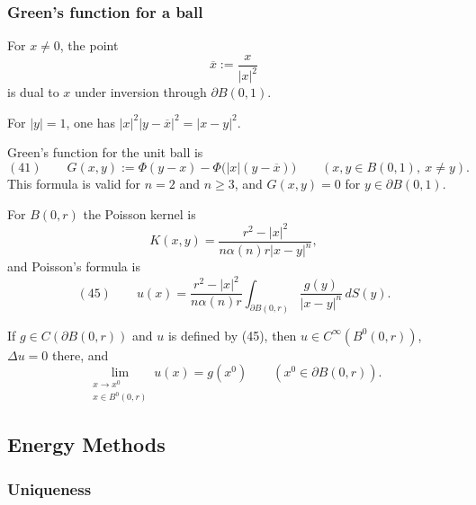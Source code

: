 \subsubsection{Green's function for a ball}
\label{sec:laplace-greens-function-ball}

\begin{definition}
\label{def:dual-point-unit-sphere}
\leanok
For $x\ne0$, the point
$$\overline x:=\frac{x}{|x|^2}$$
is dual to $x$ under inversion through $\partial B(0,1)$.
\end{definition}

For $|y|=1$, one has $|x|^2|y-\overline x|^2=|x-y|^2$.

\begin{definition}
\label{def:greens-function-ball}
\leanok
Green's function for the unit ball is
$$(41)\qquad
G(x,y):=\Phi(y-x)-\Phi\bigl(|x|(y-\overline x)\bigr)
\qquad(x,y\in B(0,1),\ x\ne y).$$
This formula is valid for $n=2$ and $n\ge3$, and $G(x,y)=0$ for
$y\in\partial B(0,1)$.
\end{definition}

For $B(0,r)$ the Poisson kernel is
$$K(x,y)=\frac{r^2-|x|^2}{n\alpha(n)r|x-y|^n},$$
and Poisson's formula is
$$(45)\qquad
u(x)=\frac{r^2-|x|^2}{n\alpha(n)r}
\int_{\partial B(0,r)}\frac{g(y)}{|x-y|^n}\,dS(y).$$

\begin{theorem}
\label{thm:poissons-formula-ball}
If $g\in C(\partial B(0,r))$ and $u$ is defined by (45), then
$u\in C^\infty(B^0(0,r))$, $\Delta u=0$ there, and
$$\lim_{\substack{x\to x^0\\x\in B^0(0,r)}}u(x)=g(x^0)
\qquad(x^0\in\partial B(0,r)).$$
\end{theorem}

\subsection{Energy Methods}
\label{sec:laplace-energy-methods}

\subsubsection{Uniqueness}
\label{sec:laplace-energy-uniqueness}

